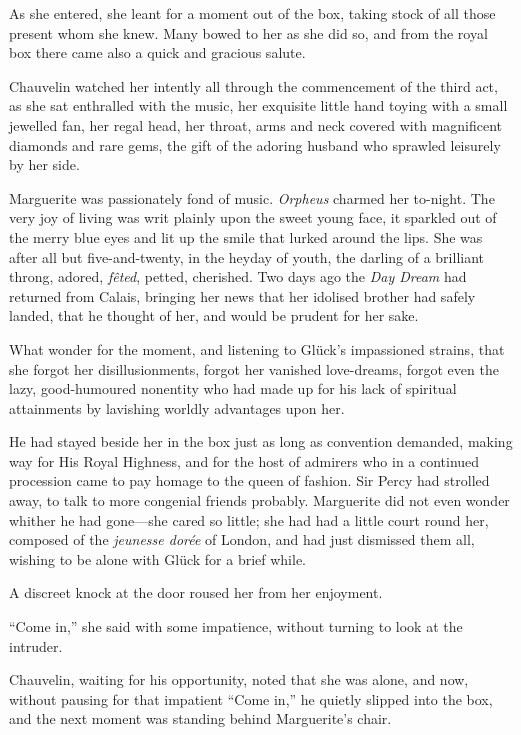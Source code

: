 \documentclass[paper=a5,BCOR=7mm,twoside,DIV=calc,12pt,usegeometry,chapterprefix,endperiod,headings=big]{scrbook}
\begin{document}
As she entered, she leant for a moment out of the box, taking stock of all those present whom she knew. Many bowed to her as she did so, and from the royal box there came also a quick and gracious salute.

Chauvelin watched her intently all through the commencement of the third act, as she sat enthralled with the music, her exquisite little hand toying with a small jewelled fan, her regal head, her throat, arms and neck covered with magnificent diamonds and rare gems, the gift of the adoring husband who sprawled leisurely by her side.

Marguerite was passionately fond of music. \textit{Orpheus} charmed her to-night. The very joy of living was writ plainly upon the sweet young face, it sparkled out of the merry blue eyes and lit up the smile that lurked around the lips. She was after all but five-and-twenty, in the heyday of youth, the darling of a brilliant throng, adored, \textit{fêted}, petted, cherished. Two days ago the \textit{Day Dream} had returned from Calais, bringing her news that her idolised brother had safely landed, that he thought of her, and would be prudent for her sake.

What wonder for the moment, and listening to Glück's impassioned strains, that she forgot her disillusionments, forgot her vanished love-dreams, forgot even the lazy, good-humoured nonentity who had made up for his lack of spiritual attainments by lavishing worldly advantages upon her.

He had stayed beside her in the box just as long as convention demanded, making way for His Royal Highness, and for the host of admirers who in a continued procession came to pay homage to the queen of fashion. Sir Percy had strolled away, to talk to more congenial friends probably. Marguerite did not even wonder whither he had gone---she cared so little; she had had a little court round her, composed of the \textit{jeunesse dorée} of London, and had just dismissed them all, wishing to be alone with Glück for a brief while.

A discreet knock at the door roused her from her enjoyment.

\enquote{Come in,} she said with some impatience, without turning to look at the intruder.

Chauvelin, waiting for his opportunity, noted that she was alone, and now, without pausing for that impatient \enquote{Come in,} he quietly slipped into the box, and the next moment was standing behind Marguerite's chair.
\end{document}
